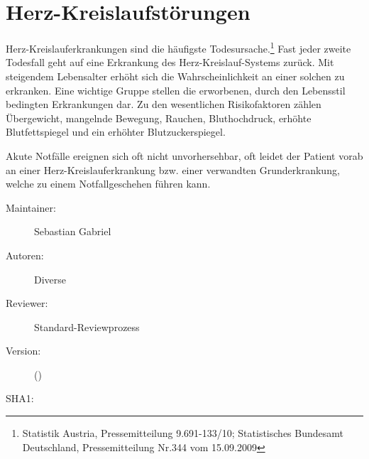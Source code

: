 % 
% 
% 
% 
\def\ChapterCode{HKL}
\chapter
[\CO{[HKL]} Herz-Kreislaufstörungen]
{Herz-Kreislaufstörungen}
\ChapterIntro
{%
Herz-Kreislauferkrankungen sind die häufigste
Todesursache.\footnote{Statistik Austria, Pressemitteilung
9.691-133/10; Statistisches Bundesamt Deutschland,
Pressemitteilung Nr.344 vom 15.09.2009} Fast jeder zweite
Todesfall geht auf eine Erkrankung des
Herz-Kreislauf-Systems zurück.  Mit steigendem Lebensalter
erhöht sich die Wahrscheinlichkeit an einer solchen zu
erkranken. 
Eine wichtige Gruppe stellen die erworbenen, durch den
Lebensstil bedingten Erkrankungen dar. Zu den wesentlichen
Risikofaktoren zählen Übergewicht, mangelnde Bewegung,
Rauchen, Bluthochdruck, erhöhte Blutfettspiegel und ein
erhöhter Blutzuckerspiegel.

Akute Notfälle ereignen sich oft nicht unvorhersehbar, oft
leidet der Patient vorab an  einer
Herz-Kreislauferkrankung bzw. einer verwandten
Grunderkrankung, welche zu einem Notfallgeschehen führen
kann.
}
{%
\begin{description}
  \item[Maintainer:] Sebastian Gabriel
  \item[Autoren:] Diverse
  \item[Reviewer:] Standard-Reviewprozess
  \item[Version:] {\DocVersion} ({\DocVersionInfo})
  \item[SHA1:] {\DocGitCommit}
\end{description}

{\TxTeilkapitelAASS}
}


